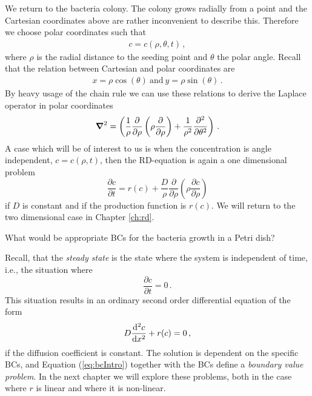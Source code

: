\begin{example}
	We return to the bacteria colony. The colony grows radially from a point and
	the Cartesian coordinates above are rather inconvenient to describe this. Therefore 
	we choose polar coordinates such that
	\begin{eqnarray}
		 c = c(\rho, \theta, t) \, ,
	\end{eqnarray}
	where $\rho$ is the radial distance to the seeding point 
	and $\theta$ the polar angle. Recall that the relation between 
	Cartesian and polar coordinates are
	\begin{eqnarray}
		x = \rho \cos(\theta) \ \text{and} \   y = \rho \sin(\theta) \, .
	\end{eqnarray}
	By heavy usage of the chain rule we can use these relations to derive the 
	Laplace operator in polar coordinates
	\begin{eqnarray}
		\boldsymbol{\nabla}^2 = \left(\frac{1}{\rho}\frac{\partial}{\partial \rho}
		\left( \rho \frac{\partial }{\partial \rho}\right)  +
		\frac{1}{\rho^2}\frac{\partial^2}{\partial \theta^2}\right) \, .
	\end{eqnarray}
	A case which will be of interest to us is when the concentration is angle
	independent, $c= c(\rho,t)$, then the RD-equation is again a one dimensional problem 
	\begin{equation}
		\label{eq:rdpol}
		\frac{\partial c}{\partial t} = r(c) +
		\frac{D}{\rho}\frac{\partial}{\partial \rho}
		\left(  \rho\frac{\partial c}{\partial \rho} \right) 
	\end{equation}
	if $D$ is constant and if the production function is $r(c)$. We will return to the two
	dimensional case in Chapter \ref{ch:rd}. 
\end{example}	

\begin{question}
	What would be appropriate BCs for the bacteria growth in a Petri dish?
\end{question}

\iffalse
\noindent Recall, that the \emph{steady state}  is the state where the system is independent
of time, i.e., the situation where 
\begin{equation}
	\frac{\partial c}{\partial t} = 0 \, .
\end{equation}
This situation results in an ordinary second order differential equation of the form
\begin{equation}
	\label{eq:bcIntro}
	D\frac{\mathrm{d}^2 c}{\mathrm{d} x^2} + r(c) = 0 \, ,
\end{equation}
if the diffusion coefficient is constant. The solution is dependent on the specific BCs, 
and Equation (\ref{eq:bcIntro}) together with the BCs define a 
\emph{boundary value problem}.  
In the next chapter we will explore these problems, both in the case where $r$ is linear and where
it is non-linear. 

